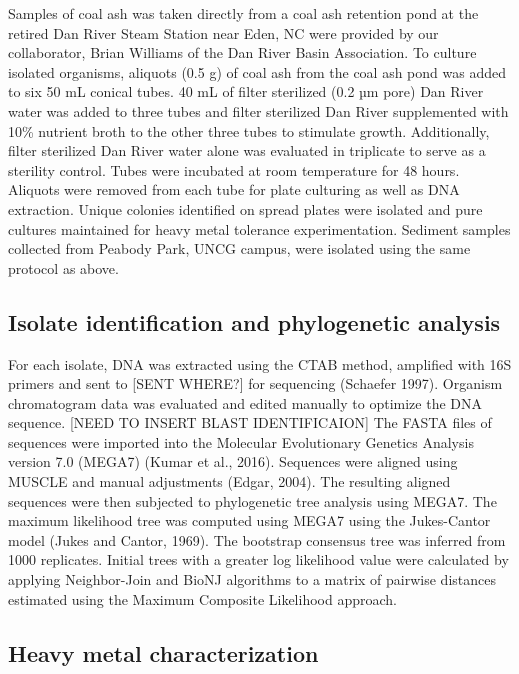\documentclass[ms]{uncgdissertationexp}
\theoremstyle{plain}
\theoremstyle{definition}
\theoremstyle{remark}
\begin{document}
  Samples of coal ash was taken directly from a coal ash retention pond at
  the retired Dan River Steam Station near Eden, NC were provided by our
  collaborator, Brian Williams of the Dan River Basin Association. To
  culture isolated organisms, aliquots (0.5 g) of coal ash from the coal
  ash pond was added to six 50 mL conical tubes. 40 mL of filter
  sterilized (0.2 µm pore) Dan River water was added to three tubes and
  filter sterilized Dan River supplemented with 10\% nutrient broth to the
  other three tubes to stimulate growth. Additionally, filter sterilized
  Dan River water alone was evaluated in triplicate to serve as a
  sterility control. Tubes were incubated at room temperature for 48
  hours. Aliquots were removed from each tube for plate culturing as well
  as DNA extraction. Unique colonies identified on spread plates were
  isolated and pure cultures maintained for heavy metal tolerance
  experimentation. Sediment samples collected from Peabody Park, UNCG
  campus, were isolated using the same protocol as above.
  
  \subsection{Isolate identification and phylogenetic
  analysis}\label{isolate-identification-and-phylogenetic-analysis}
  
  For each isolate, DNA was extracted using the CTAB method, amplified
  with 16S primers and sent to {[}SENT WHERE?{]} for sequencing (Schaefer
  1997). Organism chromatogram data was evaluated and edited manually to
  optimize the DNA sequence. {[}NEED TO INSERT BLAST IDENTIFICAION{]} The
  FASTA files of sequences were imported into the Molecular Evolutionary
  Genetics Analysis version 7.0 (MEGA7) (Kumar et al., 2016). Sequences
  were aligned using MUSCLE and manual adjustments (Edgar, 2004). The
  resulting aligned sequences were then subjected to phylogenetic tree
  analysis using MEGA7. The maximum likelihood tree was computed using
  MEGA7 using the Jukes-Cantor model (Jukes and Cantor, 1969). The
  bootstrap consensus tree was inferred from 1000 replicates. Initial
  trees with a greater log likelihood value were calculated by applying
  Neighbor-Join and BioNJ algorithms to a matrix of pairwise distances
  estimated using the Maximum Composite Likelihood approach.
  
  \subsection{Heavy metal
  characterization}\label{heavy-metal-characterization}
  
\end{document}
